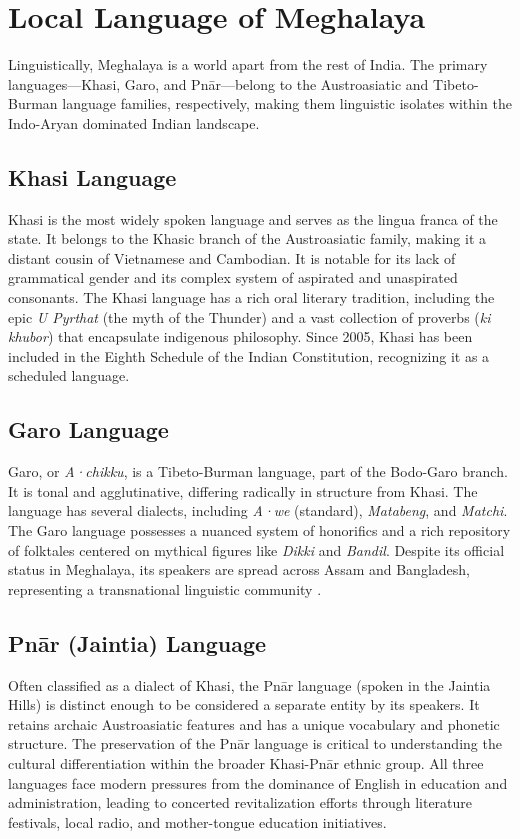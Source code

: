 \documentclass[12pt]{article}
\begin{document}
\section{Local Language of Meghalaya}
Linguistically, Meghalaya is a world apart from the rest of India. The primary languages—Khasi, Garo, and Pnār—belong to the Austroasiatic and Tibeto-Burman language families, respectively, making them linguistic isolates within the Indo-Aryan dominated Indian landscape.

\subsection{Khasi Language}
Khasi is the most widely spoken language and serves as the lingua franca of the state. It belongs to the Khasic branch of the Austroasiatic family, making it a distant cousin of Vietnamese and Cambodian. It is notable for its lack of grammatical gender and its complex system of aspirated and unaspirated consonants. The Khasi language has a rich oral literary tradition, including the epic \textit{U Pyrthat} (the myth of the Thunder) and a vast collection of proverbs (\textit{ki khubor}) that encapsulate indigenous philosophy. Since 2005, Khasi has been included in the Eighth Schedule of the Indian Constitution, recognizing it as a scheduled language.

\subsection{Garo Language}
Garo, or \textit{A·chikku}, is a Tibeto-Burman language, part of the Bodo-Garo branch. It is tonal and agglutinative, differing radically in structure from Khasi. The language has several dialects, including \textit{A·we} (standard), \textit{Matabeng}, and \textit{Matchi}. The Garo language possesses a nuanced system of honorifics and a rich repository of folktales centered on mythical figures like \textit{Dikki} and \textit{Bandil}. Despite its official status in Meghalaya, its speakers are spread across Assam and Bangladesh, representing a transnational linguistic community \citep{Marak2005}.

\subsection{Pnār (Jaintia) Language}
Often classified as a dialect of Khasi, the Pnār language (spoken in the Jaintia Hills) is distinct enough to be considered a separate entity by its speakers. It retains archaic Austroasiatic features and has a unique vocabulary and phonetic structure. The preservation of the Pnār language is critical to understanding the cultural differentiation within the broader Khasi-Pnār ethnic group. All three languages face modern pressures from the dominance of English in education and administration, leading to concerted revitalization efforts through literature festivals, local radio, and mother-tongue education initiatives.
\end{document}
